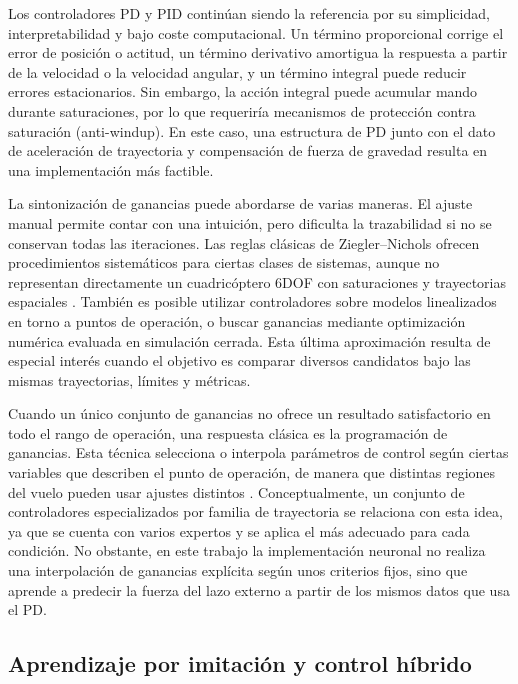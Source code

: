 Los controladores PD y PID continúan siendo la referencia por su simplicidad,
interpretabilidad y bajo coste computacional. Un término proporcional corrige el
error de posición o actitud, un término derivativo amortigua la respuesta a partir
de la velocidad o la velocidad angular, y un término integral puede reducir errores
estacionarios. Sin embargo, la acción integral puede acumular mando durante saturaciones, 
por lo que requeriría mecanismos de protección contra saturación (anti-windup). En este caso, una estructura de PD
junto con el dato de aceleración de trayectoria y compensación de fuerza de gravedad
resulta en una implementación más factible.

La sintonización de ganancias puede abordarse de varias maneras. El ajuste
manual permite contar con una intuición, pero dificulta la trazabilidad si no se
conservan todas las iteraciones. Las reglas clásicas de Ziegler--Nichols ofrecen 
procedimientos sistemáticos para ciertas clases de sistemas, aunque no representan
directamente un cuadricóptero 6DOF con saturaciones y trayectorias espaciales 
\cite{ziegler1942optimum}. También es posible utilizar controladores sobre modelos 
linealizados en torno a puntos de operación, o buscar ganancias mediante optimización 
numérica evaluada en simulación cerrada. Esta última aproximación resulta de especial
interés cuando el objetivo es comparar diversos candidatos bajo las mismas
trayectorias, límites y métricas.

Cuando un único conjunto de ganancias no ofrece un resultado satisfactorio en
todo el rango de operación, una respuesta clásica es la programación de ganancias.
Esta técnica selecciona o interpola parámetros de control según ciertas variables que
describen el punto de operación, de manera que distintas regiones del vuelo pueden
usar ajustes distintos \cite{leith2000survey}. Conceptualmente, un conjunto de
controladores especializados por familia de trayectoria se relaciona con esta idea, ya
que se cuenta con varios expertos y se aplica el más adecuado para cada condición. 
No obstante, en este trabajo la implementación neuronal no realiza una interpolación
de ganancias explícita según unos criterios fijos, sino que aprende a predecir la fuerza
del lazo externo a partir de los mismos datos que usa el PD.

\subsection{Aprendizaje por imitación y control híbrido}

